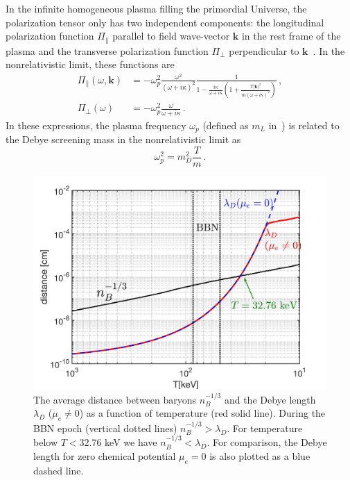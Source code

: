 In the infinite homogeneous plasma filling the primordial Universe, the polarization tensor only has two independent components: the longitudinal polarization function $\Pi_{\parallel}$ parallel to field wave-vector $\boldsymbol{k}$ in the rest frame of the plasma and the transverse polarization function $\Pi_{\perp}$ perpendicular to $\boldsymbol{k}$~\cite{melrose2008quantum}. In the nonrelativistic limit, these functions are~\cite{Formanek:2021blc}
\begin{align}\label{eq:polfuncs}
	\Pi_\parallel(\omega,\boldsymbol{k}) &= -\omega_p^2\frac{\omega^2}{(\omega+ i \kappa)^2} \frac{1}{1-\frac{i\kappa}{\omega+ i \kappa}\left(1+\frac{ T |\boldsymbol{k}|^2}{m (\omega+ i \kappa)^2} \right)}\,,\\
	\Pi_{\perp}(\omega) &= -\omega_p^2 \frac{\omega}{\omega+ i \kappa}\,.
\end{align}
In these expressions, the plasma frequency $\omega_p$ (defined as $m_L$ in~\cite{Formanek:2021blc}) is related to the Debye screening mass in the nonrelativistic limit as
\begin{equation}\label{eq:plasmafreq}
 \omega_p^2 = m_D^2\frac{T}{m}\,.
\end{equation}

\begin{figure} 
\centerline{\includegraphics[width=0.80\linewidth]{plots/Distance_Plasma002.jpg}}
\caption{ The average distance between baryons $n_B^{-1/3}$ and the Debye length $\lambda_D$ ($\mu_e \neq 0$) as a function of temperature (red solid line). During the BBN epoch (vertical dotted lines) $n_B^{-1/3}>\lambda_D$. For temperature below $T<32.76$ keV we have $n_B^{-1/3}<\lambda_D$. For comparison, the Debye length for zero chemical potential $\mu_e=0$ is also plotted as a blue dashed line. }
\label{MeanFreePath_fig} 
\end{figure}

